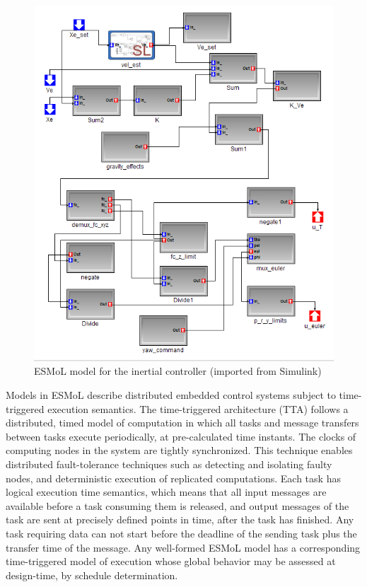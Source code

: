 \begin{figure}[ht]
\centering
\includegraphics[width=\columnwidth]{figures/starmac_gme.png}
    \caption{ESMoL model for the inertial controller (imported from Simulink)}
    \label{fig:gme_ctrl}
\end{figure}

Models in ESMoL\cite{aces08} describe distributed embedded control systems subject to time-triggered execution semantics.  The time-triggered architecture (TTA) follows a distributed, timed model of computation in which all tasks and message transfers between tasks execute periodically, at pre-calculated time instants\cite{kopetz:2001-22a}. The clocks of computing nodes in the system are tightly synchronized. This technique enables distributed fault-tolerance techniques such as detecting and isolating faulty nodes, and deterministic execution of replicated computations.  Each task has logical execution time semantics\cite{henzinger01giotto}, which means that all input messages are available before a task consuming them is released, and output messages of the task are sent at precisely defined points in time, after the task has finished.  Any task requiring data can not start before the deadline of the sending task plus the transfer time of the message.  Any well-formed ESMoL model has a corresponding time-triggered model of execution whose global behavior may be assessed at design-time, by schedule determination.


